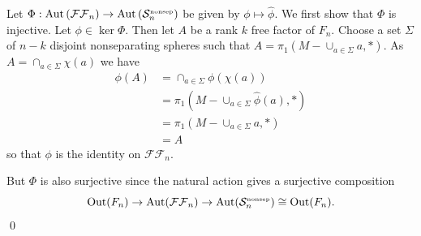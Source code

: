 \documentclass[12pt]{article}
\newcommand{\nosep}{{\ensuremath{ \mathcal S^{\mbox{\tiny{nonsep}}}_n }}}
\newcommand{\ffn}{{\ensuremath{ \mathcal {FF}_n }}}
\DeclareMathOperator{\oout}{Out}
\DeclareMathOperator{\aaut}{Aut}
\begin{document}
Let $\Phi: \aaut \left ( \ffn \right ) \to  \aaut \left ( \nosep \right )$ be given by $\phi \mapsto \hat \phi$.
We first show that $\Phi$ is injective.
Let $\phi \in \ker \Phi$.
Then let $A$ be a rank $k$ free factor of $F_n$.
Choose a set $\Sigma$ of $n-k$ disjoint nonseparating spheres such that $A=\pi_1 (M-\cup_{a \in \Sigma} a,\ast)$.
As $A= \cap_{a \in \Sigma} \chi (a)$ we have
\begin{align*}
\phi(A) &=  \cap_{a \in \Sigma}  \phi (\chi (a)) \\
&= \pi_1 (M- \cup_{a \in \Sigma} \hat \phi(a), \ast)\\
&= \pi_1 (M- \cup_{a \in \Sigma} a, \ast )\\
&=A
\end{align*}
so that $\phi$ is the identity on $\ffn$.

But $\Phi$ is also surjective since the natural action gives a surjective composition
$$
\oout (F_n) \to \aaut ( \ffn ) \to \aaut (\nosep) \cong \oout(F_n).
$$
\qed

\nocite{*}
 
{}

\end{document}
